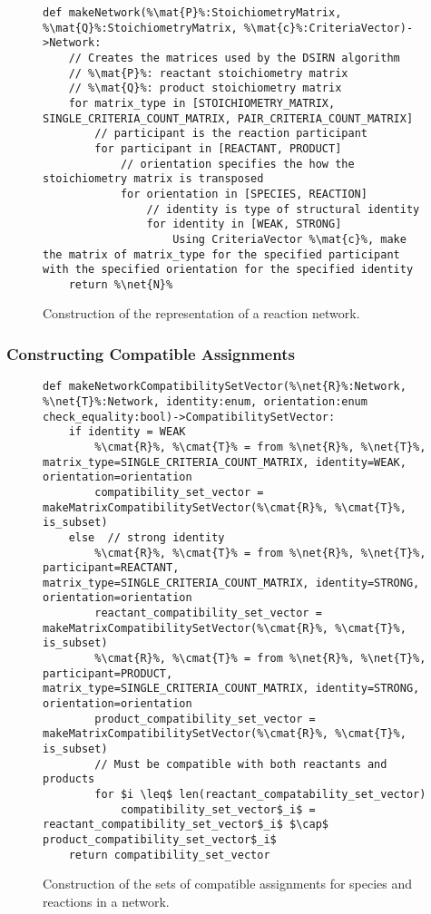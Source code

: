 \documentclass{article}
\newcommand{\mat}[1]{${\bf #1}$} %
\newcommand{\net}[1]{$\mathcal{#1}$} %
\newcommand{\cmat}[1]{${\bf #1}^{\bf c}$} %
\begin{document}
\begin{figure}
\begin{lstlisting}[mathescape=true,escapechar=\%]
def makeNetwork(%\mat{P}%:StoichiometryMatrix, %\mat{Q}%:StoichiometryMatrix, %\mat{c}%:CriteriaVector)->Network:
    // Creates the matrices used by the DSIRN algorithm
    // %\mat{P}%: reactant stoichiometry matrix
    // %\mat{Q}%: product stoichiometry matrix
    for matrix_type in [STOICHIOMETRY_MATRIX, SINGLE_CRITERIA_COUNT_MATRIX, PAIR_CRITERIA_COUNT_MATRIX]
        // participant is the reaction participant
        for participant in [REACTANT, PRODUCT]
            // orientation specifies the how the stoichiometry matrix is transposed
            for orientation in [SPECIES, REACTION]
                // identity is type of structural identity
                for identity in [WEAK, STRONG]
                    Using CriteriaVector %\mat{c}%, make the matrix of matrix_type for the specified participant with the specified orientation for the specified identity
    return %\net{N}%         
\end{lstlisting}
\caption{Construction of the representation of a reaction network.}\label{alg:makeNetwork}
\end{figure}


\subsubsection{Constructing Compatible Assignments}

\begin{figure}
\begin{lstlisting}[mathescape=true,escapechar=\%]
def makeNetworkCompatibilitySetVector(%\net{R}%:Network, %\net{T}%:Network, identity:enum, orientation:enum check_equality:bool)->CompatibilitySetVector:
    if identity = WEAK
        %\cmat{R}%, %\cmat{T}% = from %\net{R}%, %\net{T}%, matrix_type=SINGLE_CRITERIA_COUNT_MATRIX, identity=WEAK, orientation=orientation
        compatibility_set_vector = makeMatrixCompatibilitySetVector(%\cmat{R}%, %\cmat{T}%, is_subset)
    else  // strong identity
        %\cmat{R}%, %\cmat{T}% = from %\net{R}%, %\net{T}%, participant=REACTANT, matrix_type=SINGLE_CRITERIA_COUNT_MATRIX, identity=STRONG, orientation=orientation
        reactant_compatibility_set_vector = makeMatrixCompatibilitySetVector(%\cmat{R}%, %\cmat{T}%, is_subset)
        %\cmat{R}%, %\cmat{T}% = from %\net{R}%, %\net{T}%, participant=PRODUCT, matrix_type=SINGLE_CRITERIA_COUNT_MATRIX, identity=STRONG, orientation=orientation
        product_compatibility_set_vector = makeMatrixCompatibilitySetVector(%\cmat{R}%, %\cmat{T}%, is_subset)
        // Must be compatible with both reactants and products
        for $i \leq$ len(reactant_compatability_set_vector)
            compatibility_set_vector$_i$ = reactant_compatibility_set_vector$_i$ $\cap$ product_compatibility_set_vector$_i$
    return compatibility_set_vector
\end{lstlisting}
\caption{Construction of the sets of compatible assignments for species and reactions in a network.}\label{alg:makeNetworkCompatibilitySetVector}
\end{figure}
\end{document}
